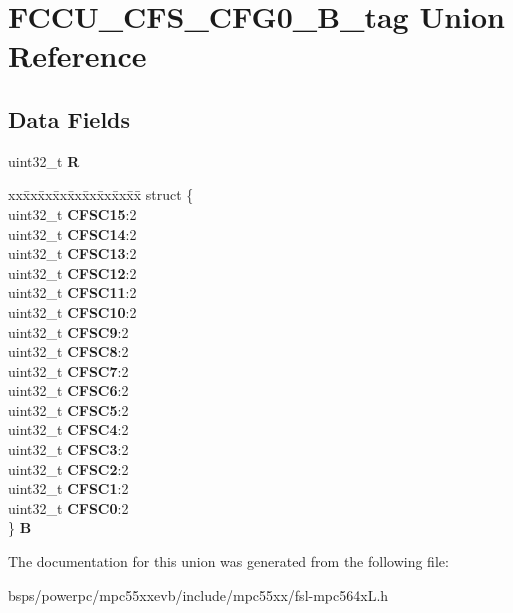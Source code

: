 \hypertarget{unionFCCU__CFS__CFG0__32B__tag}{}\section{F\+C\+C\+U\+\_\+\+C\+F\+S\+\_\+\+C\+F\+G0\+\_\+B\+\_\+tag Union Reference}
\label{unionFCCU__CFS__CFG0__32B__tag}
\subsection*{Data Fields}
\begin{DoxyCompactItemize}
\item 
\mbox{\label{unionFCCU__CFS__CFG0__32B__tag_a17675b58a374b562aaf12376a13bffff}} 
uint32\+\_\+t {\bfseries R}
\item 
\mbox{\label{unionFCCU__CFS__CFG0__32B__tag_a82c7a4e04daeed7da4947954ee92998a}} 
\begin{tabbing}
xx\=xx\=xx\=xx\=xx\=xx\=xx\=xx\=xx\=\kill
struct \{\\
\>uint32\_t {\bfseries CFSC15}:2\\
\>uint32\_t {\bfseries CFSC14}:2\\
\>uint32\_t {\bfseries CFSC13}:2\\
\>uint32\_t {\bfseries CFSC12}:2\\
\>uint32\_t {\bfseries CFSC11}:2\\
\>uint32\_t {\bfseries CFSC10}:2\\
\>uint32\_t {\bfseries CFSC9}:2\\
\>uint32\_t {\bfseries CFSC8}:2\\
\>uint32\_t {\bfseries CFSC7}:2\\
\>uint32\_t {\bfseries CFSC6}:2\\
\>uint32\_t {\bfseries CFSC5}:2\\
\>uint32\_t {\bfseries CFSC4}:2\\
\>uint32\_t {\bfseries CFSC3}:2\\
\>uint32\_t {\bfseries CFSC2}:2\\
\>uint32\_t {\bfseries CFSC1}:2\\
\>uint32\_t {\bfseries CFSC0}:2\\
\} {\bfseries B}\\

\end{tabbing}\end{DoxyCompactItemize}


The documentation for this union was generated from the following file\+:\begin{DoxyCompactItemize}
\item 
bsps/powerpc/mpc55xxevb/include/mpc55xx/fsl-\/mpc564x\+L.\+h\end{DoxyCompactItemize}
